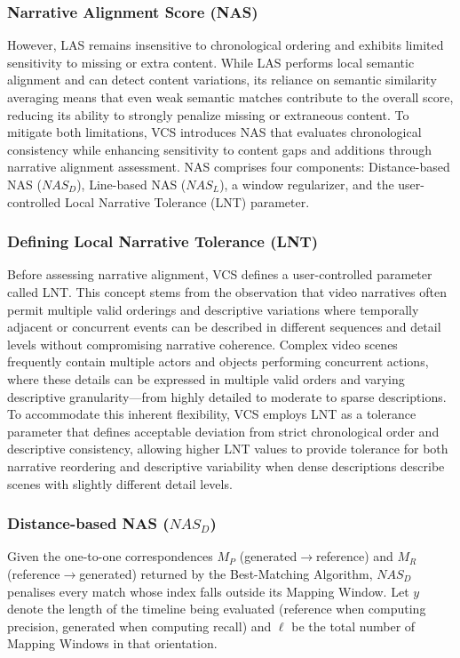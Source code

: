 \documentclass[main.tex]{subfiles}
\begin{document}
\subsubsection{Narrative Alignment Score (NAS)}
However, LAS remains insensitive to chronological ordering and exhibits limited sensitivity to missing or extra content. While LAS performs local semantic alignment and can detect content variations, its reliance on semantic similarity averaging means that even weak semantic matches contribute to the overall score, reducing its ability to strongly penalize missing or extraneous content. To mitigate both limitations, VCS introduces NAS that evaluates chronological consistency while enhancing sensitivity to content gaps and additions through narrative alignment assessment. NAS comprises four components: Distance-based NAS ($NAS_D$), Line-based NAS ($NAS_L$), a window regularizer, and the user-controlled Local Narrative Tolerance (LNT) parameter.

\subsubsection{Defining Local Narrative Tolerance (LNT)}
Before assessing narrative alignment, VCS defines a user-controlled parameter called LNT. This concept stems from the observation that video narratives often permit multiple valid orderings and descriptive variations where temporally adjacent or concurrent events can be described in different sequences and detail levels without compromising narrative coherence. Complex video scenes frequently contain multiple actors and objects performing concurrent actions, where these details can be expressed in multiple valid orders and varying descriptive granularity—from highly detailed to moderate to sparse descriptions. To accommodate this inherent flexibility, VCS employs LNT as a tolerance parameter that defines acceptable deviation from strict chronological order and descriptive consistency, allowing higher LNT values to provide tolerance for both narrative reordering and descriptive variability when dense descriptions describe scenes with slightly different detail levels.

\subsubsection{Distance-based NAS ($NAS_D$)}
Given the one-to-one correspondences $M_P$ (generated$\rightarrow$reference) and $M_R$ (reference$\rightarrow$generated) returned by the Best-Matching Algorithm, $NAS_D$ penalises every match whose index falls outside its Mapping Window. Let $y$ denote the length of the timeline being evaluated (reference when computing precision, generated when computing recall) and $\ell$ be the total number of Mapping Windows in that orientation.
\end{document}
